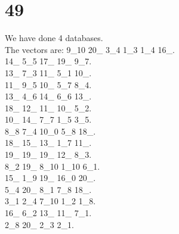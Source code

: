 \chapter{49}
\indent We have done 4 databases.\\
The vectors are:
9\_10 20\_ 3\_4 1\_3 1\_4 16\_.\\14\_ 5\_5 17\_ 19\_ 9\_7.\\13\_ 7\_3 11\_ 5\_1 10\_.\\11\_ 9\_5 10\_ 5\_7 8\_4.\\13\_ 4\_6 14\_ 6\_6 13\_.\\18\_ 12\_ 11\_ 10\_ 5\_2.\\10\_ 14\_ 7\_7 1\_5 3\_5.\\8\_8 7\_4 10\_0 5\_8 18\_.\\18\_ 15\_ 13\_ 1\_7 11\_.\\19\_ 19\_ 19\_ 12\_ 8\_3.\\8\_2 19\_ 8\_10 1\_10 6\_1.\\15\_ 1\_9 19\_ 16\_0 20\_.\\5\_4 20\_ 8\_1 7\_8 18\_.\\3\_1 2\_4 7\_10 1\_2 1\_8.\\16\_ 6\_2 13\_ 11\_ 7\_1.\\2\_8 20\_ 2\_3 2\_1.\\